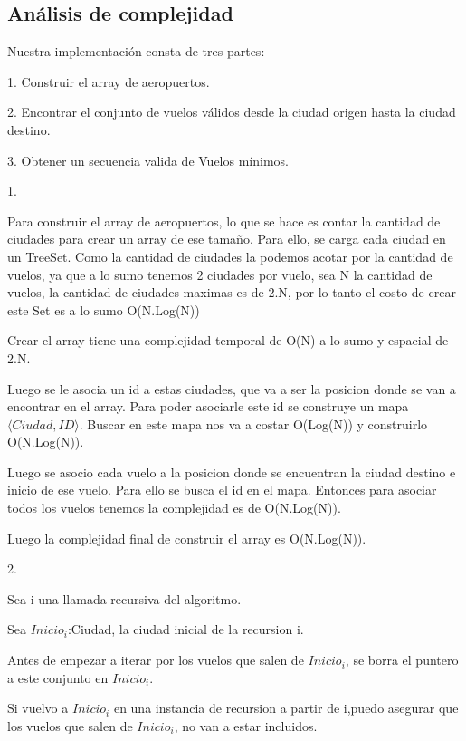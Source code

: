 \newpage

\subsection{Análisis de complejidad}
Nuestra implementaci\'on consta de tres partes:

1. Construir el array de aeropuertos.

2. Encontrar el conjunto de vuelos v\'alidos desde la ciudad origen hasta la ciudad destino.

3. Obtener un secuencia valida de Vuelos m\'inimos.

1.

Para construir el array de aeropuertos, lo que se hace es contar la cantidad de ciudades para crear un array de ese tamaño.
Para ello, se carga cada ciudad en un TreeSet. Como la cantidad de ciudades la podemos acotar por la cantidad de vuelos, ya que a lo sumo tenemos 2 ciudades por vuelo, sea N la cantidad de vuelos, la cantidad de ciudades maximas es de 2.N, por lo tanto el costo de crear este Set es a lo sumo O(N.Log(N))

Crear el array tiene una complejidad temporal de O(N) a lo sumo y espacial de 2.N.

Luego se le asocia un id a estas ciudades, que va a ser la posicion donde se van a encontrar en el array. Para poder asociarle este id se construye un mapa $\langle Ciudad,ID \rangle$.
Buscar en este mapa nos va a costar O(Log(N)) y construirlo O(N.Log(N)).

Luego se asocio cada vuelo a la posicion donde se encuentran la ciudad destino e inicio de ese vuelo.
Para ello se busca el id en el mapa. Entonces para asociar todos los vuelos tenemos la complejidad es de O(N.Log(N)).

Luego la complejidad final de construir el array es O(N.Log(N)).

2.

Sea i una llamada recursiva del algoritmo.

Sea $Inicio_{i}$:Ciudad, la ciudad inicial de la recursion i.



Antes de empezar a iterar por los vuelos que salen de $Inicio_{i}$, se borra el puntero a este conjunto en $Inicio_{i}$.

Si vuelvo a $Inicio_{i}$ en una instancia de recursion a partir de i,puedo asegurar que los vuelos que salen de $Inicio_{i}$, no van a estar incluidos.


